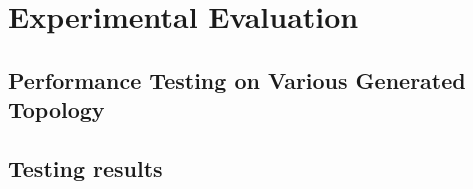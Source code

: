 
\chapter{Experimental Evaluation}
\label{Experimental Evaluation}

\section{Performance Testing on Various Generated Topology}

\section{Testing results}
